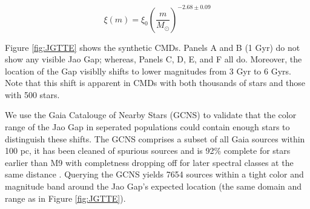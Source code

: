 \begin{equation}\label{eqn:IMF}
	\xi(m) = \xi_{0}\left(\frac{m}{M_{\odot}}\right)^{-2.68\pm0.09}
\end{equation}

%
%

Figure \ref{fig:JGTTE} shows the synthetic CMDs. Panels A and B (1 Gyr) do
not show any visible Jao Gap; whereas, Panels C, D, E, and F all do. Moreover,
the location of the Gap visiblly shifts to lower magnitudes from 3 Gyr to 6
Gyrs. Note that this shift is apparent in CMDs with both thousands of stars and those
with 500 stars. 

We use the Gaia Catalouge of Nearby Stars (GCNS) to validate that the color
range of the Jao Gap in seperated populations could contain enough stars to
distinguish these shifts. The GCNS comprises a subset of all Gaia sources
within 100 pc, it has been cleaned of spurious sources and is 92\% complete for
stars earlier than M9 with completness dropping off for later spectral classes
at the same distance \citep{GaiaCollaboration2021}. Querying the GCNS yields
7654 sources within a tight color and magnitude band around the Jao Gap's
expected location (the same domain and range as in Figure \ref{fig:JGTTE}).

